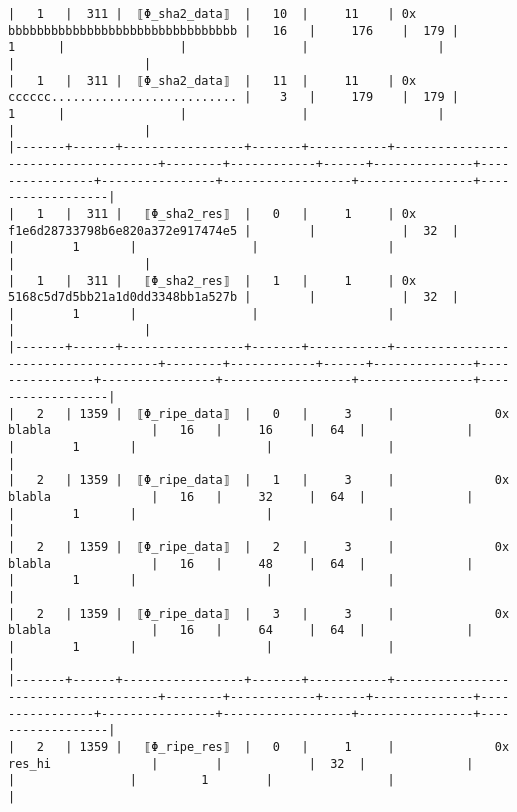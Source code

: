\documentclass[varwidth=\maxdimen,margin=0.5cm,multi={verbatim}]{standalone}
\begin{document}
\begin{verbatim}
|   1   |  311 |  ⟦Φ_sha2_data⟧  |   10  |     11    | 0x bbbbbbbbbbbbbbbbbbbbbbbbbbbbbbbb |   16   |     176    |  179 |       1      |                |                |                  |                |                  |
|   1   |  311 |  ⟦Φ_sha2_data⟧  |   11  |     11    | 0x cccccc.......................... |    3   |     179    |  179 |       1      |                |                |                  |                |                  |
|-------+------+-----------------+-------+-----------+-------------------------------------+--------+------------+------+--------------+----------------+----------------+------------------+----------------+------------------|
|   1   |  311 |   ⟦Φ_sha2_res⟧  |   0   |     1     | 0x f1e6d28733798b6e820a372e917474e5 |        |            |  32  |              |        1       |                |                  |                |                  |
|   1   |  311 |   ⟦Φ_sha2_res⟧  |   1   |     1     | 0x 5168c5d7d5bb21a1d0dd3348bb1a527b |        |            |  32  |              |        1       |                |                  |                |                  |
|-------+------+-----------------+-------+-----------+-------------------------------------+--------+------------+------+--------------+----------------+----------------+------------------+----------------+------------------|
|   2   | 1359 |  ⟦Φ_ripe_data⟧  |   0   |     3     |              0x blabla              |   16   |     16     |  64  |              |                |        1       |                  |                |                  |
|   2   | 1359 |  ⟦Φ_ripe_data⟧  |   1   |     3     |              0x blabla              |   16   |     32     |  64  |              |                |        1       |                  |                |                  |
|   2   | 1359 |  ⟦Φ_ripe_data⟧  |   2   |     3     |              0x blabla              |   16   |     48     |  64  |              |                |        1       |                  |                |                  |
|   2   | 1359 |  ⟦Φ_ripe_data⟧  |   3   |     3     |              0x blabla              |   16   |     64     |  64  |              |                |        1       |                  |                |                  |
|-------+------+-----------------+-------+-----------+-------------------------------------+--------+------------+------+--------------+----------------+----------------+------------------+----------------+------------------|
|   2   | 1359 |   ⟦Φ_ripe_res⟧  |   0   |     1     |              0x res_hi              |        |            |  32  |              |                |                |         1        |                |                  |

\end{verbatim}
\end{document}
